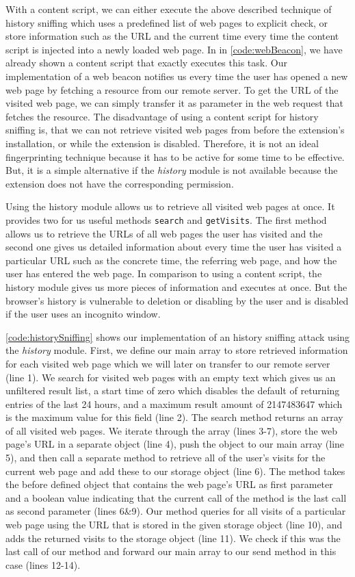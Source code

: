 	With a content script, we can either execute the above described technique of history sniffing which uses a predefined list of web pages to explicit check, or store information such as the URL and the current time every time the content script is injected into a newly loaded web page. In in \autoref{code:webBeacon}, we have already shown a content script that exactly executes this task. Our implementation of a web beacon notifies us every time the user has opened a new web page by fetching a resource from our remote server. To get the URL of the visited web page, we can simply transfer it as parameter in the web request that fetches the resource. The disadvantage of using a content script for history sniffing is, that we can not retrieve visited web pages from before the extension's installation, or while the extension is disabled. Therefore, it is not an ideal fingerprinting technique because it has to be active for some time to be effective. But, it is a simple alternative if the \textit{history} module is not available because the extension does not have the corresponding permission.
	
	Using the history module allows us to retrieve all visited web pages at once. It provides two for us useful methods \texttt{search} and \texttt{getVisits}. The first method allows us to retrieve the URLs of all web pages the user has visited and the second one gives us detailed information about every time the user has visited a particular URL such as the concrete time, the referring web page, and how the user has entered the web page. In comparison to using a content script, the history module gives us more pieces of information and executes at once. But the browser's history is vulnerable to deletion or disabling by the user and is disabled if the user uses an incognito window.
	
	\autoref{code:historySniffing} shows our implementation of an history sniffing attack using the \textit{history} module. First, we define our main array to store retrieved information for each visited web page which we will later on transfer to our remote server (line 1). We search for visited web pages with an empty text which gives us an unfiltered result list, a start time of zero which disables the default of returning entries of the last 24 hours, and a maximum result amount of 2147483647 which is the maximum value for this field (line 2). The search method returns an array of all visited web pages. We iterate through the array (lines 3-7), store the web page's URL in a separate object (line 4), push the object to our main array (line 5), and then call a separate method to retrieve all of the user's visits for the current web page and add these to our storage object (line 6). The method takes the before defined object that contains the web page's URL as first parameter and a boolean value indicating that the current call of the method is the last call as second parameter (lines 6\&9). Our method queries for all visits of a particular web page using the URL that is stored in the given storage object (line 10), and adds the returned visits to the storage object (line 11). We check if this was the last call of our method and forward our main array to our send method in this case (lines 12-14).
 
